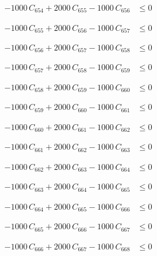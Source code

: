 \documentclass[a4paper,11pt]{article}
\begin{document}
\begin{align}
-1000\,C_{654} + 2000\,C_{655} - 1000\,C_{656} &\leq 0 \nonumber
\end{align}

\begin{align}
-1000\,C_{655} + 2000\,C_{656} - 1000\,C_{657} &\leq 0 \nonumber
\end{align}

\begin{align}
-1000\,C_{656} + 2000\,C_{657} - 1000\,C_{658} &\leq 0 \nonumber
\end{align}

\begin{align}
-1000\,C_{657} + 2000\,C_{658} - 1000\,C_{659} &\leq 0 \nonumber
\end{align}

\begin{align}
-1000\,C_{658} + 2000\,C_{659} - 1000\,C_{660} &\leq 0 \nonumber
\end{align}

\begin{align}
-1000\,C_{659} + 2000\,C_{660} - 1000\,C_{661} &\leq 0 \nonumber
\end{align}

\begin{align}
-1000\,C_{660} + 2000\,C_{661} - 1000\,C_{662} &\leq 0 \nonumber
\end{align}

\begin{align}
-1000\,C_{661} + 2000\,C_{662} - 1000\,C_{663} &\leq 0 \nonumber
\end{align}

\begin{align}
-1000\,C_{662} + 2000\,C_{663} - 1000\,C_{664} &\leq 0 \nonumber
\end{align}

\begin{align}
-1000\,C_{663} + 2000\,C_{664} - 1000\,C_{665} &\leq 0 \nonumber
\end{align}

\begin{align}
-1000\,C_{664} + 2000\,C_{665} - 1000\,C_{666} &\leq 0 \nonumber
\end{align}

\begin{align}
-1000\,C_{665} + 2000\,C_{666} - 1000\,C_{667} &\leq 0 \nonumber
\end{align}

\begin{align}
-1000\,C_{666} + 2000\,C_{667} - 1000\,C_{668} &\leq 0 \nonumber
\end{align}
\end{document}

